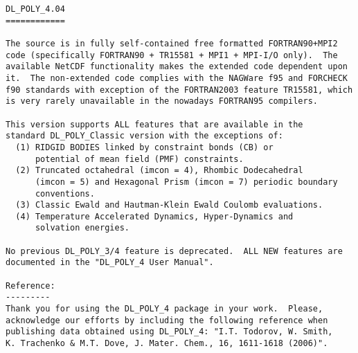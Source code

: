 \label{readme}
\begin{verbatim}
DL_POLY_4.04
============

The source is in fully self-contained free formatted FORTRAN90+MPI2
code (specifically FORTRAN90 + TR15581 + MPI1 + MPI-I/O only).  The
available NetCDF functionality makes the extended code dependent upon
it.  The non-extended code complies with the NAGWare f95 and FORCHECK
f90 standards with exception of the FORTRAN2003 feature TR15581, which
is very rarely unavailable in the nowadays FORTRAN95 compilers.

This version supports ALL features that are available in the
standard DL_POLY_Classic version with the exceptions of:
  (1) RIDGID BODIES linked by constraint bonds (CB) or
      potential of mean field (PMF) constraints.
  (2) Truncated octahedral (imcon = 4), Rhombic Dodecahedral
      (imcon = 5) and Hexagonal Prism (imcon = 7) periodic boundary
      conventions.
  (3) Classic Ewald and Hautman-Klein Ewald Coulomb evaluations.
  (4) Temperature Accelerated Dynamics, Hyper-Dynamics and
      solvation energies.

No previous DL_POLY_3/4 feature is deprecated.  ALL NEW features are
documented in the "DL_POLY_4 User Manual".

Reference:
---------
Thank you for using the DL_POLY_4 package in your work.  Please,
acknowledge our efforts by including the following reference when
publishing data obtained using DL_POLY_4: "I.T. Todorov, W. Smith,
K. Trachenko & M.T. Dove, J. Mater. Chem., 16, 1611-1618 (2006)".


\end{verbatim}
